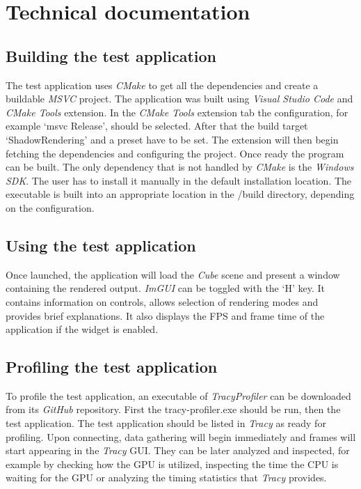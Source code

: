 \chapter{Technical documentation}

\section{Building the test application}
The test application uses \textit{CMake} to get all the dependencies and create a buildable \textit{MSVC} project. The application was built using \textit{Visual Studio Code} and \textit{CMake Tools} extension. In the \textit{CMake Tools} extension tab the configuration, for example `msvc Release', should be selected. After that the build target `ShadowRendering' and a preset have to be set. The extension will then begin fetching the dependencies and configuring the project. Once ready the program can be built. The only dependency that is not handled by \textit{CMake} is the \textit{Windows SDK}. The user has to install it manually in the default installation location. The executable is built into an appropriate location in the /build directory, depending on the configuration.

\section{Using the test application}
Once launched, the application will load the \textit{Cube} scene and present a window containing the rendered output. \textit{ImGUI} can be toggled with the `H' key. It contains information on controls, allows selection of rendering modes and provides brief explanations. It also displays the FPS and frame time of the application if the widget is enabled.

\section{Profiling the test application}
To profile the test application, an executable of \textit{TracyProfiler} can be downloaded from its \textit{GitHub} repository. First the tracy-profiler.exe should be run, then the test application. The test application should be listed in \textit{Tracy} as ready for profiling. Upon connecting, data gathering will begin immediately and frames will start appearing in the \textit{Tracy} GUI. They can be later analyzed and inspected, for example by checking how the GPU is utilized, inspecting the time the CPU is waiting for the GPU or analyzing the timing statistics that \textit{Tracy} provides.